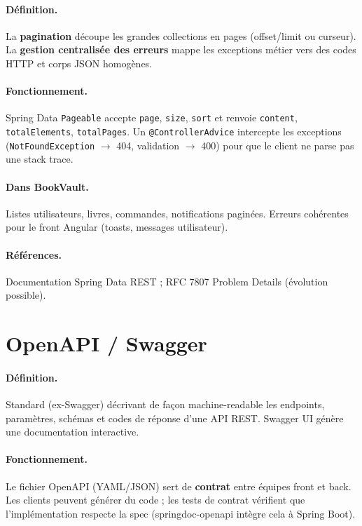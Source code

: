 \documentclass[12pt,a4paper]{report}
\begin{document}
\paragraph{Définition.} La \textbf{pagination} découpe les grandes collections en pages (offset/limit ou curseur). La \textbf{gestion centralisée des erreurs} mappe les exceptions métier vers des codes HTTP et corps JSON homogènes.\par

\paragraph{Fonctionnement.} Spring Data \texttt{Pageable} accepte \texttt{page}, \texttt{size}, \texttt{sort} et renvoie \texttt{content}, \texttt{totalElements}, \texttt{totalPages}. Un \texttt{@ControllerAdvice} intercepte les exceptions (\texttt{NotFoundException} $\rightarrow$ 404, validation $\rightarrow$ 400) pour que le client ne parse pas une stack trace.\par

\paragraph{Dans BookVault.} Listes utilisateurs, livres, commandes, notifications paginées. Erreurs cohérentes pour le front Angular (toasts, messages utilisateur).\par

\paragraph{Références.} Documentation Spring Data REST ; RFC 7807 Problem Details (évolution possible).\par


\section{OpenAPI / Swagger}

\paragraph{Définition.} Standard (ex-Swagger) décrivant de façon machine-readable les endpoints, paramètres, schémas et codes de réponse d'une API REST. Swagger UI génère une documentation interactive.\par

\paragraph{Fonctionnement.} Le fichier OpenAPI (YAML/JSON) sert de \textbf{contrat} entre équipes front et back. Les clients peuvent générer du code ; les tests de contrat vérifient que l'implémentation respecte la spec (springdoc-openapi intègre cela à Spring Boot).\par
\end{document}
